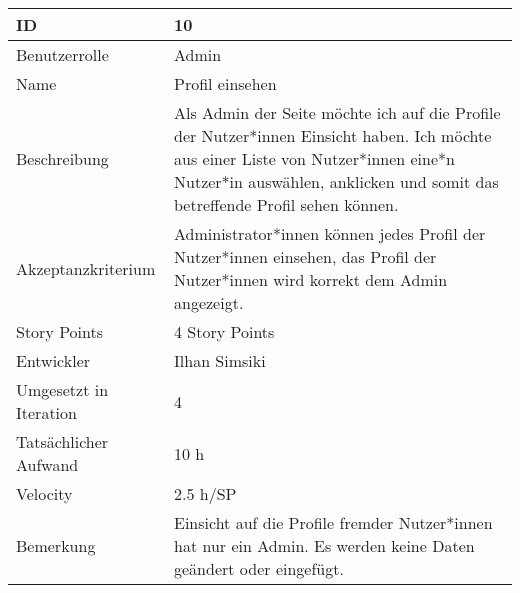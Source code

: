 \begin{tabularx}{\textwidth}{|p{}|X|}
	\hline
	ID & 10\\
	\hline
	Benutzerrolle & Admin\\
	\hline
	Name & Profil einsehen\\
	\hline
	Beschreibung & Als Admin der Seite möchte ich auf die Profile der Nutzer*innen Einsicht haben. Ich möchte aus einer Liste von Nutzer*innen eine*n Nutzer*in auswählen, anklicken und somit das betreffende Profil sehen können.\\
	\hline
	Akzeptanzkriterium & Administrator*innen können jedes Profil der Nutzer*innen einsehen, das Profil der Nutzer*innen wird korrekt dem Admin angezeigt.\\
	\hline
	Story Points & 4 Story Points\\
	\hline
	Entwickler & Ilhan Simsiki\\
	\hline
	Umgesetzt in Iteration & 4\\
	\hline
	Tatsächlicher Aufwand & 10 h\\
	\hline
	Velocity & 2.5 h/SP\\
	\hline
	Bemerkung & Einsicht auf die Profile fremder Nutzer*innen hat nur ein Admin. Es werden keine Daten geändert oder eingefügt.\\
	\hline
\end{tabularx}
\vspace{20pt}
